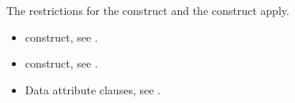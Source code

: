 \restrictions
The restrictions for the  construct and the  construct apply.

\crossreferences
\begin{itemize}
\item {} construct, see
.

\item {} construct, see
.

\item Data attribute clauses, see
.
\end{itemize}










